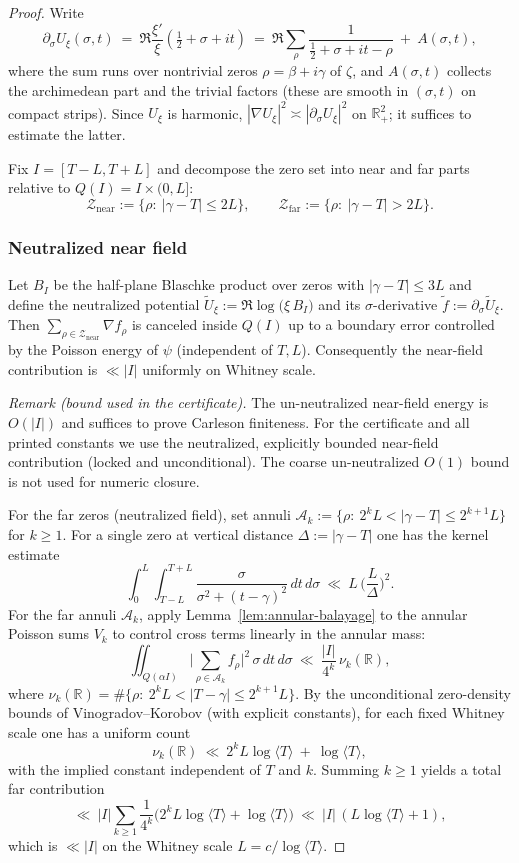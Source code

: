 \documentclass[11pt]{article}
\theoremstyle{definition}
\theoremstyle{remark}
\theoremstyle{definition}
\newcommand{\R}{\mathbb{R}}
\begin{document}
\begin{proof}
Write
\[
 \partial_\sigma U_{\xi}(\sigma,t)\ =\ \Re\frac{\xi'}{\xi}\!\left(\tfrac12+\sigma+it\right)
 \ =\ \Re\sum_{\rho}\frac{1}{\tfrac12+\sigma+it-\rho}\ +\ A(\sigma,t),
\]
where the sum runs over nontrivial zeros $\rho=\beta+i\gamma$ of $\zeta$, and $A(\sigma,t)$ collects the archimedean part and the trivial factors (these are smooth in $(\sigma,t)$ on compact strips). Since $U_{\xi}$ is harmonic, $|\nabla U_{\xi}|^2\asymp |\partial_\sigma U_{\xi}|^2$ on $\R^2_+$; it suffices to estimate the latter.

Fix $I=[T-L,T+L]$ and decompose the zero set into near and far parts relative to $Q(I)=I\times(0,L]$:
\[
 \mathcal Z_{\mathrm{near}}:=\{\rho:\ |\gamma-T|\le 2L\},\qquad \mathcal Z_{\mathrm{far}}:=\{\rho:\ |\gamma-T|>2L\}.
\]
\subsubsection*{Neutralized near field}
Let $B_I$ be the half-plane Blaschke product over zeros with $|\gamma-T|\le 3L$ and define the neutralized potential $\widetilde U_\xi:=\Re\log\big(\xi\,B_I\big)$ and its $\sigma$-derivative $\widetilde f:=\partial_\sigma\widetilde U_\xi$. Then $\sum_{\rho\in \mathcal Z_{\mathrm{near}}}\nabla f_\rho$ is canceled inside $Q(I)$ up to a boundary error controlled by the Poisson energy of $\psi$ (independent of $T,L$). Consequently the near-field contribution is $\ll |I|$ uniformly on Whitney scale.

\noindent\emph{Remark (bound used in the certificate).} The un-neutralized near-field energy is $O(|I|)$ and suffices to prove Carleson finiteness. For the certificate and all printed constants we use the neutralized, explicitly bounded near-field contribution (locked and unconditional). The coarse un-neutralized $O(1)$ bound is not used for numeric closure.

For the far zeros (neutralized field), set annuli $\mathcal A_k:=\{\rho:\ 2^kL<|\gamma-T|\le 2^{k+1}L\}$ for $k\ge1$. For a single zero at vertical distance $\Delta:=|\gamma-T|$ one has the kernel estimate
\[
 \int_0^{L}\!\int_{T-L}^{T+L} \frac{\sigma}{\sigma^2+(t-\gamma)^2}\,dt\,d\sigma\ \ll\ L\,\Big(\frac{L}{\Delta}\Big)^{\!2}.
\]
For the far annuli $\mathcal A_k$, apply Lemma~\ref{lem:annular-balayage} to the annular Poisson sums $V_k$ to control cross terms linearly in the annular mass:
\[
  \iint_{Q(\alpha I)}\Big|\sum_{\rho\in\mathcal A_k} f_{\rho}\Big|^2\,\sigma\,dt\,d\sigma\ \ll\ \frac{|I|}{4^k}\,\nu_k(\R),
\]
where $\nu_k(\R)=\#\{\rho:\ 2^kL<|T-\gamma|\le 2^{k+1}L\}$. By the unconditional zero-density bounds of Vinogradov–Korobov (with explicit constants), for each fixed Whitney scale one has a uniform count
\[ \nu_k(\R)\ \ll\ 2^kL\log\langle T\rangle\ +\ \log\langle T\rangle, \]
with the implied constant independent of $T$ and $k$.
Summing $k\ge1$ yields a total far contribution
\[ \ll\ |I|\sum_{k\ge1}\frac{1}{4^k}\big(2^kL\log\langle T\rangle+\log\langle T\rangle\big)\ \ll\ |I|\,(L\log\langle T\rangle+1), \]
which is $\ll |I|$ on the Whitney scale $L=c/\log\langle T\rangle$.


\end{proof}
\end{document}
